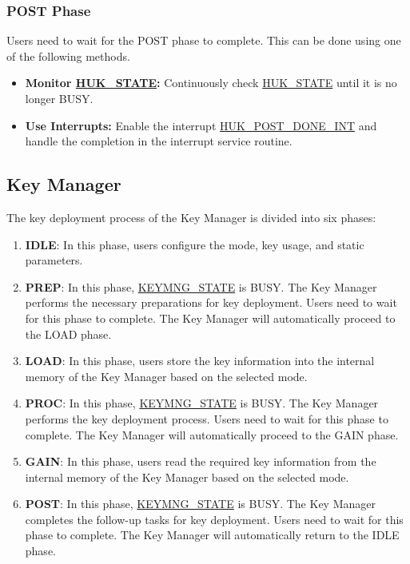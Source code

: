 \documentclass[main\_\_EN.tex]{subfiles}
\begin{document}
\subsubsection{POST Phase}

Users need to wait for the POST phase to complete. This can be done using one of the following methods.
\begin{itemize}
    \item \textbf{Monitor \hyperref[fielddesc:HUKSTATE]{HUK\_STATE}:} Continuously check \hyperref[fielddesc:HUKSTATE]{HUK\_STATE} until it is no longer BUSY.
    \item \textbf{Use Interrupts:} Enable the interrupt \hyperref[int:HUKPOSTDONEINT]{HUK\_POST\_DONE\_INT} and handle the completion in the interrupt service routine.
\end{itemize}


\subsection{Key Manager}

The key deployment process of the Key Manager is divided into six phases:
\begin{enumerate}
    \item \textbf{IDLE}: In this phase, users configure the mode, key usage, and static parameters.
    \item \textbf{PREP}: In this phase, \hyperref[fielddesc:KEYMNGSTATE]{KEYMNG\_STATE} is BUSY. The Key Manager performs the necessary preparations for key deployment. Users need to wait for this phase to complete. The Key Manager will automatically proceed to the LOAD phase.
    \item \textbf{LOAD}: In this phase, users store the key information into the internal memory of the Key Manager based on the selected mode.
    \item \textbf{PROC}: In this phase, \hyperref[fielddesc:KEYMNGSTATE]{KEYMNG\_STATE} is BUSY. The Key Manager performs the key deployment process. Users need to wait for this phase to complete. The Key Manager will automatically proceed to the GAIN phase.
    \item \textbf{GAIN}: In this phase, users read the required key information from the internal memory of the Key Manager based on the selected mode.
    \item \textbf{POST}: In this phase, \hyperref[fielddesc:KEYMNGSTATE]{KEYMNG\_STATE} is BUSY. The Key Manager completes the follow-up tasks for key deployment. Users need to wait for this phase to complete. The Key Manager will automatically return to the IDLE phase.
\end{enumerate}
\end{document}
